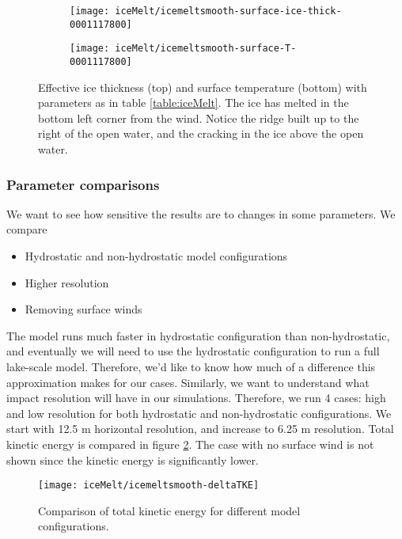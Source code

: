 \documentclass[11pt]{article}
\begin{document}
\clearpage
\begin{figure}[h!]
\begin{subfigure}{0.8\linewidth}
\centering
\texttt{[image: iceMelt/icemeltsmooth-surface-ice-thick-0001117800]}
\end{subfigure}
\begin{subfigure}{0.8\linewidth}
\texttt{[image: iceMelt/icemeltsmooth-surface-T-0001117800]}
\end{subfigure}
\caption{Effective ice thickness (top) and surface temperature (bottom) with parameters as in table \ref{table:iceMelt}. The ice has melted in the bottom left corner from the wind. Notice the ridge built up to the right of the open water, and the cracking in the ice above the open water.}
\label{fig:iceMelt0}
\end{figure}

\subsubsection*{Parameter comparisons}
We want to see how sensitive the results are to changes in some parameters. We compare
\begin{itemize}
\item{Hydrostatic and non-hydrostatic model configurations}
\item{Higher resolution}
\item{Removing surface winds}
\end{itemize}
The model runs much faster in hydrostatic configuration than non-hydrostatic, and eventually we will need to use the hydrostatic configuration to run a full lake-scale model. Therefore, we'd like to know how much of a difference this approximation makes for our cases. Similarly, we want to understand what impact resolution will have in our simulations. Therefore, we run 4 cases: high and low resolution for both hydrostatic and non-hydrostatic configurations. We start with 12.5 m horizontal resolution, and increase to 6.25 m resolution. Total kinetic energy is compared in figure \ref{fig:iceMeltCompareTKE}. The case with no surface wind is not shown since the kinetic energy is significantly lower.

\begin{figure}[h!]
\centering
\texttt{[image: iceMelt/icemeltsmooth-deltaTKE]}
\caption{Comparison of total kinetic energy for different model configurations.}
\label{fig:iceMeltCompareTKE}
\end{figure}
\end{document}
